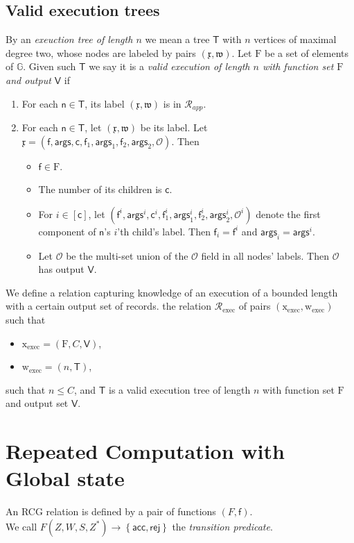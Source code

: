 \documentclass[11pt]{article} %
\newcommand{\G}{\ensuremath{{\mathbb G}}\xspace}
\newcommand{\rej}{\ensuremath{\mathsf{rej}}\xspace}
\newcommand{\acc}{\ensuremath{\mathsf{acc}}\xspace}
\newcommand{\rel}{\ensuremath{\mathcal{R}}\xspace}
\newcommand{\set}[1]{\ensuremath{\left\{#1\right\}}\xspace}
\newcommand{\f}{\ensuremath{\mathsf{f}}\xspace}
\newcommand{\relapp}{\ensuremath{\rel_{app}}\xspace}
\newcommand{\relexec}{\ensuremath{\rel_{\mathrm{exec}}}\xspace}
\newcommand{\ops}{\ensuremath{\mathcal{O}}\xspace}
\newcommand{\instapp}{\ensuremath{\mathfrak{x}}\xspace}
\newcommand{\witapp}{\ensuremath{\mathfrak{w}}\xspace}
\newcommand{\funcs}{\ensuremath{\mathrm{F}}\xspace}
\newcommand{\instexec}{\ensuremath{\mathrm{x_{exec}}}\xspace}
\newcommand{\witexec}{\ensuremath{\mathrm{w_{exec}}}\xspace}
\newcommand{\args}{\ensuremath{\mathsf{args}}\xspace}
\newcommand{\callnum}{\ensuremath{\mathsf{c}}\xspace}
\newcommand{\recset}{\ensuremath{\mathsf{V}}\xspace}
\newcommand{\tree}{\ensuremath{\mathsf{T}}\xspace}
\newcommand{\node}{\ensuremath{\mathsf{n}}\xspace}
\newcommand{\finpred}{\ensuremath{\mathsf{f}}\xspace}
\begin{document}
\subsection{Valid execution trees}\label{sec:validexec}

By an \emph{exeuction tree of length $n$} we mean a tree \tree with $n$ vertices of maximal degree two, whose nodes are
labeled by pairs $(\instapp,\witapp)$.
Let \funcs be a set of elements of \G.
Given such \tree we say it is a \emph{valid execution of length $n$ with function set \funcs and output \recset} if
\begin{enumerate}
 \item For each $\node\in\tree$, its label $(\instapp,\witapp)$ is in \relapp.
    \item For each $\node\in \tree$, let $(\instapp,\witapp)$ be its label. Let 
$\instapp= (\f,\args,\callnum, \f_1,\args_1, \f_2,\args_2,\ops)$. Then
    \begin{itemize}
    \item $\f\in \funcs$.
     \item The number of its children is \callnum.
     \item For $i\in [\callnum]$, let $(\f^i,\args^i,\callnum^i, \f^{i}_{1},\args^i_{1}, \f^i_{2},\args^i_{2},\ops^i)$ denote the first component of $\node$'s $i$'th child's label. Then $\f_i=\f^i$ and  $\args_i=\args^i$.
     \item Let \ops be the multi-set union of the \ops field in all nodes' labels. Then \ops has output \recset.
     
    \end{itemize}

\end{enumerate}

We define a relation capturing knowledge of an execution of a bounded length with a certain output set of records.
the relation $\relexec$ of pairs $(\instexec,\witexec)$
such that
\begin{itemize}
 \item $\instexec=(\funcs,C,\recset)$,
 \item $\witexec=(n,\tree)$,
\end{itemize}
such that $n\leq C$, and  \tree is a valid execution tree of length $n$ with function set \funcs and output set \recset. 

\section{Repeated Computation with Global state}
An RCG relation is defined by a pair of functions $(F,\finpred)$.\\
\noindent
We call $F(Z,W,S,Z^*)\to \set{\acc,\rej}$ the \emph{transition predicate}.
\end{document}

